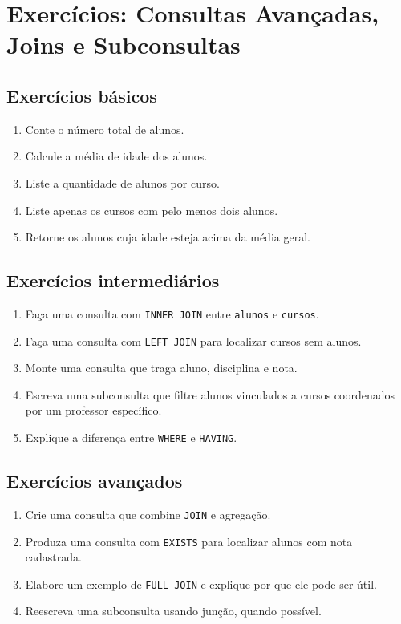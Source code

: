 \section{Exercícios: Consultas Avançadas, Joins e Subconsultas}
\subsection{Exercícios básicos}

\begin{enumerate}
    \item Conte o número total de alunos.
    \item Calcule a média de idade dos alunos.
    \item Liste a quantidade de alunos por curso.
    \item Liste apenas os cursos com pelo menos dois alunos.
    \item Retorne os alunos cuja idade esteja acima da média geral.
\end{enumerate}

\subsection{Exercícios intermediários}

\begin{enumerate}
    \item Faça uma consulta com \texttt{INNER JOIN} entre \texttt{alunos} e \texttt{cursos}.
    \item Faça uma consulta com \texttt{LEFT JOIN} para localizar cursos sem alunos.
    \item Monte uma consulta que traga aluno, disciplina e nota.
    \item Escreva uma subconsulta que filtre alunos vinculados a cursos coordenados por um professor específico.
    \item Explique a diferença entre \texttt{WHERE} e \texttt{HAVING}.
\end{enumerate}

\subsection{Exercícios avançados}

\begin{enumerate}
    \item Crie uma consulta que combine \texttt{JOIN} e agregação.
    \item Produza uma consulta com \texttt{EXISTS} para localizar alunos com nota cadastrada.
    \item Elabore um exemplo de \texttt{FULL JOIN} e explique por que ele pode ser útil.
    \item Reescreva uma subconsulta usando junção, quando possível.
\end{enumerate}


